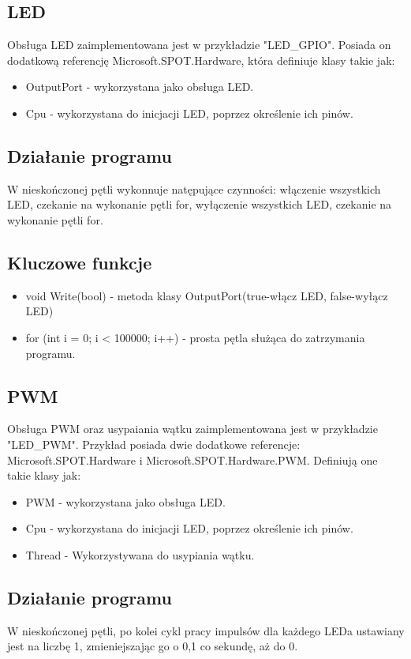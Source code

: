 \documentclass{article}
\begin{document}
\subsection{LED}
Obsługa LED zaimplementowana jest w przykładzie "LED\_GPIO". Posiada on dodatkową referencję Microsoft.SPOT.Hardware, która definiuje klasy takie jak:
\begin{itemize}
\item OutputPort - wykorzystana jako obsługa LED.
\item Cpu - wykorzystana do inicjacji LED, poprzez określenie ich pinów.
\end{itemize}
\subsection*{Działanie programu}
W nieskończonej pętli wykonnuje natępujące czynności: włączenie wszystkich LED, czekanie na wykonanie pętli for, wyłączenie wszystkich LED, czekanie na wykonanie pętli for.
\subsection*{Kluczowe funkcje}
\begin{itemize}
\item void Write(bool) - metoda klasy OutputPort(true-włącz LED, false-wyłącz LED)
\item for (int i = 0; i < 100000; i++) {} - prosta pętla służąca do zatrzymania programu.
\end{itemize}
\subsection{PWM}
Obsługa PWM oraz usypaiania wątku zaimplementowana jest w przykładzie "LED\_PWM". Przykład posiada dwie dodatkowe referencje: Microsoft.SPOT.Hardware i Microsoft.SPOT.Hardware.PWM. Definiują one takie klasy jak:
\begin{itemize}
\item PWM - wykorzystana jako obsługa LED.
\item Cpu - wykorzystana do inicjacji LED, poprzez określenie ich pinów.
\item Thread - Wykorzystywana do usypiania wątku. 
\end{itemize}
\subsection*{Działanie programu}
W nieskończonej pętli, po kolei cykl pracy impulsów dla każdego LEDa ustawiany jest na liczbę 1, zmieniejszając go o 0,1 co sekundę, aż do 0.
\end{document}
